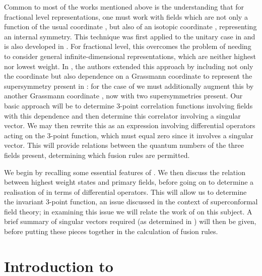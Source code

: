 \documentclass[a4paper,12pt]{article}
\def\thetabar    {\bar{\theta}}
\def\hslc        {\hat{sl}(2|1;{\mathbb C})}
\begin{document}
Common to most of the works mentioned above is the understanding that
for fractional level representations, one must work with fields which
are not only a function of the usual coordinate \coordHE{}, but also of an
isotopic coordinate \coordHE{}, representing an internal \coordHE{} symmetry.
This technique was first applied to the unitary \coordHE{} case in
\cite{FZ} and is also developed in \cite{BS}.  For fractional level,
this overcomes the problem of needing to consider general
infinite-dimensional representations, which are neither highest nor
lowest weight.  In \cite{ER}, the authors extended this approach by
including not only the coordinate \coordHE{} but also dependence on a
Grassmann coordinate \myHighlight{$\theta$}\coordHE{} to represent the supersymmetry present
in \coordHE{}: for the case of \myHighlight{$\hslc$}\coordHE{} we must additionally
augment this by another Grassmann coordinate \myHighlight{$\thetabar$}\coordHE{}, now with two
supersymmetries present.  Our basic approach will be to determine
3-point correlation functions involving fields with this
dependence and then determine this correlator involving a singular
vector.  We may then rewrite this as an expression involving
differential operators acting on the 3-point function, which must
equal zero since it involves a singular vector.  This will provide
relations between the quantum numbers of the three fields present,
determining which fusion rules are permitted.  

We begin by recalling some essential features of \myHighlight{$\hslc$}\coordHE{}.  We then
discuss the relation between highest weight states and primary fields,
before going on to determine a realisation of \myHighlight{$\hslc$}\coordHE{} in terms of
differential operators.  This will allow us to determine the \myHighlight{$\hslc$}\coordHE{}
invariant 3-point function, an issue discussed in the context of
\coordHE{} superconformal field theory; in examining this issue we will
relate the work of \cite{Kir, MSS, West, Bl} on this subject.  A
brief summary of singular vectors required (as determined in
\cite{BT97}) will then be given, before putting these pieces together
in the calculation of fusion rules.   

   

\section{Introduction to \myHighlight{$\hslc$}\coordHE{}}
\end{document}
